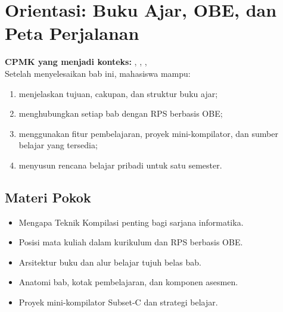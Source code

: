 \documentclass[../../main.tex]{subfiles}
\begin{document}
\chapter[Orientasi Buku Ajar]{Orientasi: Buku Ajar, OBE, dan Peta Perjalanan}
\label{chap:orientasi}

\begin{outcomebox}
\textbf{CPMK yang menjadi konteks:} , , , \\[3pt]
Setelah menyelesaikan bab ini, mahasiswa mampu:
\begin{enumerate}[label=\arabic*.,leftmargin=*]
  \item menjelaskan tujuan, cakupan, dan struktur buku ajar;
  \item menghubungkan setiap bab dengan RPS berbasis OBE;
  \item menggunakan fitur pembelajaran, proyek mini-kompilator, dan
        sumber belajar yang tersedia;
  \item menyusun rencana belajar pribadi untuk satu semester.
\end{enumerate}
\end{outcomebox}

\section*{Materi Pokok}
\begin{itemize}[leftmargin=*]
  \item Mengapa Teknik Kompilasi penting bagi sarjana informatika.
  \item Posisi mata kuliah dalam kurikulum dan RPS berbasis OBE.
  \item Arsitektur buku dan alur belajar tujuh belas bab.
  \item Anatomi bab, kotak pembelajaran, dan komponen asesmen.
  \item Proyek mini-kompilator Subset-C dan strategi belajar.
\end{itemize}















\ifSubfilesClassLoaded{%
}{}
\end{document}
